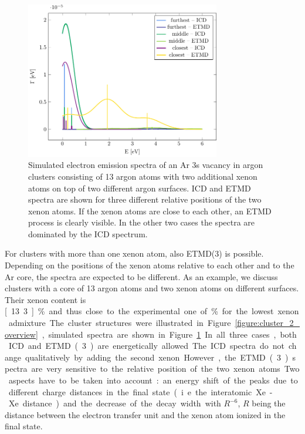 \begin{figure}[ht]
 \centering
 \includegraphics[width=8.5cm]{pics/2tops.pdf}
 \caption{Simulated electron emission spectra of an Ar 3s vacancy in 
          argon clusters consisting of 13
          argon atoms with two additional xenon atoms on top of two different
          argon surfaces. ICD and ETMD spectra are shown for three
          different relative positions of the two xenon atoms. If 
          the xenon atoms are close to each other, an ETMD process is
          clearly visible. In the other two cases the spectra are dominated by
          the ICD spectrum.}
 \label{figure:2tops}
\end{figure}
%
For clusters with more than one xenon atom, also ETMD(3) is possible.
Depending on the positions of the xenon atoms relative to each other and to the Ar core, the spectra are expected to be different.
As an example, we discuss clusters with a core of 13 argon atoms and two xenon atoms on different surfaces. 
Their xenon content is \unit[13.3]{\%} and thus close to the experimental one of \unit[10-12]{\%} for the lowest xenon admixture.
The cluster structures were illustrated in Figure \ref{figure:cluster_2_overview}, simulated spectra are shown in Figure \ref{figure:2tops}.
In all three cases, both ICD and ETMD(3) are energetically allowed. The ICD
spectra do not change qualitatively by adding the second xenon.
However, the ETMD(3) spectra
are very sensitive to the relative position of the two xenon atoms.
Two aspects have to be taken into account: an energy shift of the peaks due
to different charge distances in the final state (i.e. the interatomic Xe-Xe
distance) and the decrease of the decay width with $R^{-6}$, $R$ being the distance
between the electron transfer unit and the xenon atom ionized in the final state.
